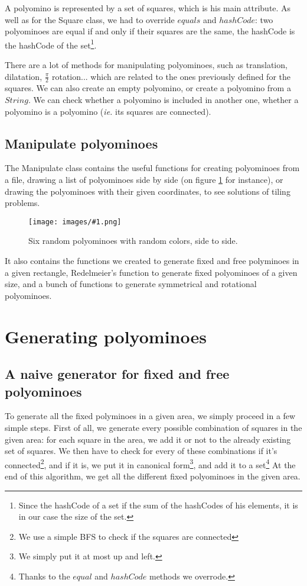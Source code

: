 \documentclass[12pt]{article}
\newcommand{\foreign}{\textit}
\newcommand{\illustration}[2]{
	\begin{figure}[]
	\begin{center}
	\texttt{[image: images/\#1.png]}
	\caption{#2}
	\label{fig:#1}
	\end{center}
	\end{figure}
}
\begin{document}
A polyomino is represented by a set of squares, which is his main attribute.
As well as for the Square class, we had to override $equals$ and $hashCode$: two polyominoes are equal if and only if their squares are the same, the hashCode is the hashCode of the set\footnote{Since the hashCode of a set if the sum of the hashCodes of his elements, it is in our case the size of the set.}.

There are a lot of methods for manipulating polyominoes, such as translation, dilatation, $\frac{\pi}{2}$ rotation... which are related to the ones previously defined for the squares.
We can also create an empty polyomino, or create a polyomino from a $String$.
We can check whether a polyomino is included in another one, whether a polyomino is a polyomino (\foreign{ie.} its squares are connected).

\subsection{Manipulate polyominoes}

The Manipulate class contains the useful functions for creating polyominoes from a file, drawing a list of polyominoes side by side (on figure \ref{fig:INF421} for instance), or drawing the polyominoes with their given coordinates, to see solutions of tiling problems.

\illustration{INF421}{Six random polyominoes with random colors, side to side.}

It also contains the functions we created to generate fixed and free polyminoes in a given rectangle, Redelmeier's function to generate fixed polyominoes of a given size, and a bunch of functions to generate symmetrical and rotational polyominoes.



\section{Generating polyominoes}

\subsection{A naive generator for fixed and free polyominoes}

To generate all the fixed polyminoes in a given area, we simply proceed in a few simple steps.
First of all, we generate every possible combination of squares in the given area: for each square in the area, we add it or not to the already existing set of squares.
We then have to check for every of these combinations if it's connected\footnote{We use a simple BFS to check if the squares are connected}, and if it is, we put it in canonical form\footnote{We simply put it at most up and left.}, and add it to a set\footnote{Thanks to the $equal$ and $hashCode$ methods we overrode.}
At the end of this algorithm, we get all the different fixed polyominoes in the given area.
\end{document}
